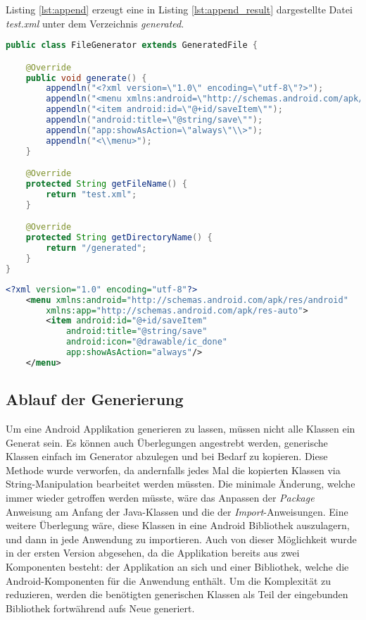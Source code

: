 Listing \ref{lst:append} erzeugt eine in Listing \ref{lst:append_result} dargestellte Datei \textit{test.xml} unter dem Verzeichnis \textit{generated}.
\begin{lstlisting}[label=lst:append,
language=java,
firstnumber=1,
caption=Beispiel eine \textit{GeneratedFile}-Instanz zur Erzeugung einer \textit{XML}-Datei.]				   
public class FileGenerator extends GeneratedFile {

	@Override
	public void generate() {
		appendln("<?xml version=\"1.0\" encoding=\"utf-8\"?>");
		appendln("<menu xmlns:android=\"http://schemas.android.com/apk/res/android\" xmlns:app=\"http://schemas.android.com/apk/res-auto\">");
		appendln("<item android:id=\"@+id/saveItem\"");
		appendln("android:title=\"@string/save\"");
		appendln("app:showAsAction=\"always\"\\>");
		appendln("<\\menu>");
	}

	@Override
	protected String getFileName() {
		return "test.xml";
	}

	@Override
	protected String getDirectoryName() {
		return "/generated";
	}
}
\end{lstlisting}

\newpage

\begin{lstlisting}[label=lst:append_result,
language=xml,
firstnumber=1,
caption=Erzeugte \textit{XML}-Datei durch den Quellcode von Listing \ref{lst:append}.]				   
<?xml version="1.0" encoding="utf-8"?>
	<menu xmlns:android="http://schemas.android.com/apk/res/android"
		xmlns:app="http://schemas.android.com/apk/res-auto">
		<item android:id="@+id/saveItem"
			android:title="@string/save"
			android:icon="@drawable/ic_done"
			app:showAsAction="always"/>
	</menu>
\end{lstlisting}

\subsection{Ablauf der Generierung}
Um eine Android Applikation generieren zu lassen, müssen nicht alle Klassen ein Generat sein. Es können auch Überlegungen angestrebt werden, generische Klassen einfach im Generator abzulegen und bei Bedarf zu kopieren. Diese Methode wurde verworfen, da andernfalls jedes Mal die kopierten Klassen via String-Manipulation bearbeitet werden müssten. Die minimale Änderung, welche immer wieder getroffen werden müsste, wäre das Anpassen der \textit{Package} Anweisung am Anfang der Java-Klassen und die der \textit{Import}-Anweisungen. Eine weitere Überlegung wäre, diese Klassen in eine Android Bibliothek auszulagern, und dann in jede Anwendung zu importieren. Auch von dieser Möglichkeit wurde in der ersten Version abgesehen, da die Applikation bereits aus zwei Komponenten besteht: der Applikation an sich und einer Bibliothek, welche die Android-Komponenten für die Anwendung enthält. Um die Komplexität zu reduzieren, werden die benötigten generischen Klassen als Teil der eingebunden Bibliothek fortwährend aufs Neue generiert.

